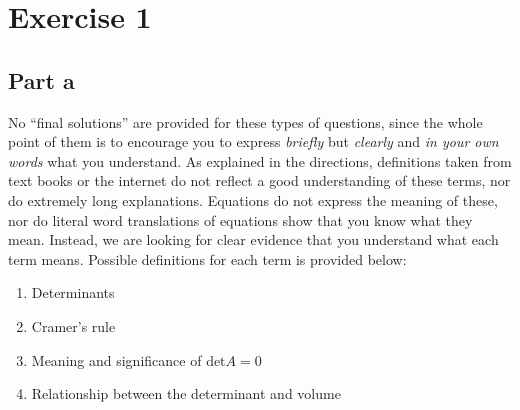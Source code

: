 \section{Exercise 1}
\subsection{Part a}

No ``final solutions'' are provided for these types of questions, since the
whole point of them is to encourage you to express \emph{briefly} but
\emph{clearly} and \emph{in your own words} what you understand. As
explained in the directions, definitions taken from text books or the
internet do not reflect a good understanding of these terms, nor do
extremely long explanations. Equations do not express the meaning of these,
nor do literal word translations of equations show that you know what they
mean. Instead, we are looking for clear evidence that you understand what
each term means. Possible definitions for each term is provided below: 

\begin{mdframed}[style=MyFrame]
    \begin{enumerate}[label=\arabic*.]
        \item Determinants
        \item Cramer's rule
        \item Meaning and significance of $\text{det}A=0$
        \item Relationship between the determinant and volume
    \end{enumerate}
\end{mdframed}

\newcommand{\deter}[1]{\text{det}(#1)}
